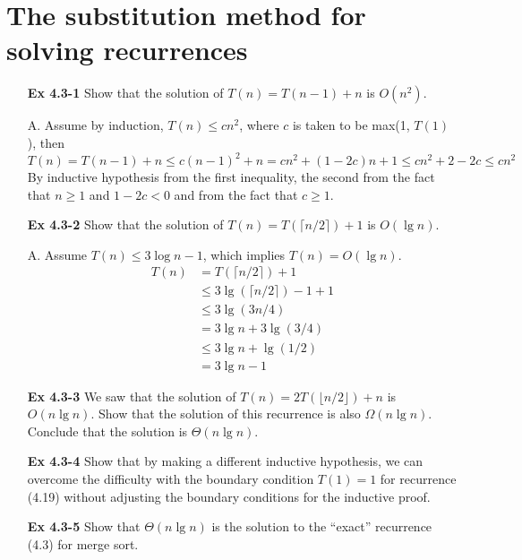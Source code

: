 \documentclass[fontsize=12pt,paper=a4]{book}
\begin{document}
\section{The substitution method for solving recurrences}
\begin{enumerate}
 \item[\textbf{Ex 4.3-1}]
       Show that the solution of $T(n) = T(n-1)+n$ is $O(n^2)$.
 \item[A.]
       Assume by induction, $T(n) \leq cn^2$, where $c$ is taken to be max(1, $T(1)$), then
       \[ T(n) = T(n-1) + n \leq c(n-1)^2 + n = cn^2 + (1-2c)n + 1 \leq cn^2 + 2 - 2c \leq cn^2 \]
       By inductive hypothesis from the first inequality, the second from the fact that $n \geq 1$ and $1-2c<0$ and from the fact that $c \geq 1$.
       
 \item[\textbf{Ex 4.3-2}]
       Show that the solution of $T(n) = T(\lceil n/2 \rceil) + 1$ is $O(\lg n)$.
 \item[A.]
       Assume $T(n) \leq 3\log n - 1$, which implies $T(n) = O(\lg n)$.
       \begin{equation*}
        \begin{split}
         T(n) & = T(\lceil n/2 \rceil) + 1 \\
         & \leq 3 \lg(\lceil n/2 \rceil) -1 + 1 \\
         & \leq 3 \lg(3n/4)\\
         & = 3\lg n + 3\lg(3/4)\\
         & \leq 3\lg n + \lg(1/2)\\
         & = 3\lg n - 1
        \end{split}
       \end{equation*}
       
 \item[\textbf{Ex 4.3-3}]
       We saw that the solution of $T(n) = 2T(\lfloor n/2 \rfloor) + n$ is $O(n \lg n)$. Show that the solution of this recurrence is also $\Omega(n \lg n)$. Conclude that the solution is $\Theta(n \lg n)$.
       
 \item[\textbf{Ex 4.3-4}]
       Show that by making a different inductive hypothesis, we can overcome the difficulty with the boundary condition $T(1) = 1$ for recurrence (4.19) without adjusting the boundary conditions for the inductive proof.
       
 \item[\textbf{Ex 4.3-5}]
       Show that $\Theta(n \lg n)$ is the solution to the “exact” recurrence (4.3) for merge sort.
       

\end{enumerate}
\end{document}

